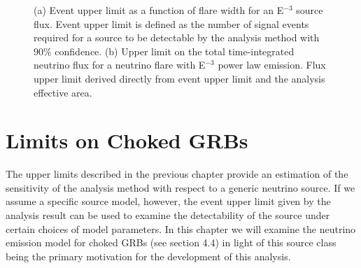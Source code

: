 \documentclass{gatech-thesis}
\begin{document}
\begin{figure}\label{fig:time_int_flux_limit}
\centering
{}
\caption[Generic Neutrino Spectrum Limits]{(a) Event upper limit as a function of flare width for an E$^{-3}$ source flux. Event upper limit is defined as the number of signal events required for a source to be detectable by the analysis method with 90$\%$ confidence. (b) Upper limit on the total time-integrated neutrino flux for a neutrino flare with E$^{-3}$ power law emission. Flux upper limit derived directly from event upper limit and the analysis effective area.} 
\end{figure}


\chapter{Limits on Choked GRBs}
The upper limits described in the previous chapter provide an estimation of the sensitivity of the analysis method with respect to a generic neutrino source. If we assume a specific source model, however, the event upper limit given by the analysis result can be used to examine the detectability of the source under certain choices of model parameters. In this chapter we will examine the neutrino emission model for choked GRBs (see section 4.4) in light of this source class being the primary motivation for the development of this analysis.
\end{document}
